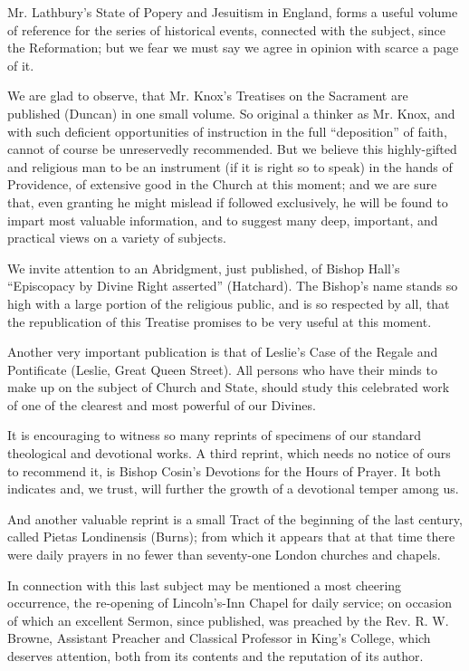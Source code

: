 Mr. Lathbury's State of Popery and Jesuitism in
England, forms a useful volume of reference for the series of historical
events, connected with the subject, since the Reformation; but we fear
we must say we agree in opinion with scarce a page of it.

We are glad to observe, that Mr. Knox's Treatises
on the Sacrament are published (Duncan) in one small volume. So original
a thinker as Mr. Knox, and with such deficient opportunities of
instruction in the full ``deposition'' of faith, cannot of course be
unreservedly recommended. But we believe this highly-gifted and
religious man to be an instrument (if it is right so to speak) in the
hands of Providence, of extensive good in the Church at this moment; and
we are sure that, even granting he might mislead if followed
exclusively, he will be found to impart most valuable information, and
to suggest many deep, important, and practical views on a variety of
subjects.

We invite attention to an Abridgment, just
published, of Bishop Hall's ``Episcopacy by Divine Right asserted'' (Hatchard).
The Bishop's name stands so high with a large portion of the religious
public, and is so respected by all, that the republication of this
Treatise promises to be very useful at this moment.

Another very important publication is that of
Leslie's Case of the Regale and Pontificate (Leslie, Great Queen
Street). All persons who have their minds to make up on the subject of
Church and State, should study this celebrated work of one of the
clearest and most powerful of our Divines.

It is encouraging to witness so many reprints of
specimens of our standard theological and devotional works. A third
reprint, which needs no notice of ours to recommend it, is Bishop Cosin's
Devotions for the Hours of Prayer. It both indicates and, we trust, will
further the growth of a devotional temper among us.

And another valuable reprint is a small Tract of
the beginning of the last century, called Pietas Londinensis (Burns);
from which it appears that at that time there were daily prayers in no
fewer than seventy-one London churches and chapels.

In connection with this last subject may be
mentioned a most cheering occurrence, the re-opening of Lincoln's-Inn
Chapel for daily service; on occasion of which an excellent Sermon,
since published, was preached by the Rev. R. W. Browne, Assistant
Preacher and Classical Professor in King's College, which deserves
attention, both from its contents and the reputation of its author.

